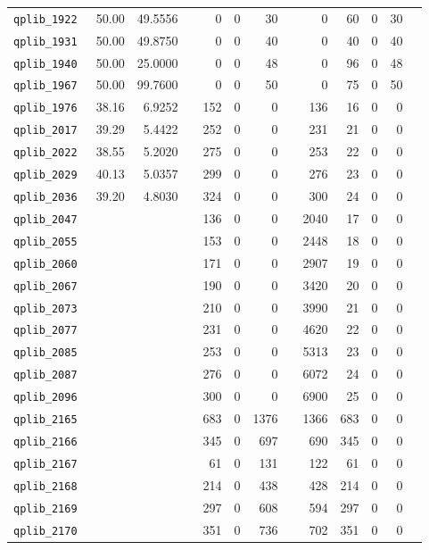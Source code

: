\begin{longtable}{lrrrrrrrrrrrr}
{\tt 	qplib\_1922	}	&	50.00	&	49.5556	&	&	0	&	0	&	30	&	&	0	&	60	&	0	&	30	\\
{\tt 	qplib\_1931	}	&	50.00	&	49.8750	&	&	0	&	0	&	40	&	&	0	&	40	&	0	&	40	\\
{\tt 	qplib\_1940	}	&	50.00	&	25.0000	&	&	0	&	0	&	48	&	&	0	&	96	&	0	&	48	\\
{\tt 	qplib\_1967	}	&	50.00	&	99.7600	&	&	0	&	0	&	50	&	&	0	&	75	&	0	&	50	\\
{\tt 	qplib\_1976	}	&	38.16	&	6.9252	&	&	152	&	0	&	0	&	&	136	&	16	&	0	&	0	\\
{\tt 	qplib\_2017	}	&	39.29	&	5.4422	&	&	252	&	0	&	0	&	&	231	&	21	&	0	&	0	\\
{\tt 	qplib\_2022	}	&	38.55	&	5.2020	&	&	275	&	0	&	0	&	&	253	&	22	&	0	&	0	\\
{\tt 	qplib\_2029	}	&	40.13	&	5.0357	&	&	299	&	0	&	0	&	&	276	&	23	&	0	&	0	\\
{\tt 	qplib\_2036	}	&	39.20	&	4.8030	&	&	324	&	0	&	0	&	&	300	&	24	&	0	&	0	\\
{\tt 	qplib\_2047	}	&		&		&	&	136	&	0	&	0	&	&	2040	&	17	&	0	&	0	\\
{\tt 	qplib\_2055	}	&		&		&	&	153	&	0	&	0	&	&	2448	&	18	&	0	&	0	\\
{\tt 	qplib\_2060	}	&		&		&	&	171	&	0	&	0	&	&	2907	&	19	&	0	&	0	\\
{\tt 	qplib\_2067	}	&		&		&	&	190	&	0	&	0	&	&	3420	&	20	&	0	&	0	\\
{\tt 	qplib\_2073	}	&		&		&	&	210	&	0	&	0	&	&	3990	&	21	&	0	&	0	\\
{\tt 	qplib\_2077	}	&		&		&	&	231	&	0	&	0	&	&	4620	&	22	&	0	&	0	\\
{\tt 	qplib\_2085	}	&		&		&	&	253	&	0	&	0	&	&	5313	&	23	&	0	&	0	\\
{\tt 	qplib\_2087	}	&		&		&	&	276	&	0	&	0	&	&	6072	&	24	&	0	&	0	\\
{\tt 	qplib\_2096	}	&		&		&	&	300	&	0	&	0	&	&	6900	&	25	&	0	&	0	\\
{\tt 	qplib\_2165	}	&		&		&	&	683	&	0	&	1376	&	&	1366	&	683	&	0	&	0	\\
{\tt 	qplib\_2166	}	&		&		&	&	345	&	0	&	697	&	&	690	&	345	&	0	&	0	\\
{\tt 	qplib\_2167	}	&		&		&	&	61	&	0	&	131	&	&	122	&	61	&	0	&	0	\\
{\tt 	qplib\_2168	}	&		&		&	&	214	&	0	&	438	&	&	428	&	214	&	0	&	0	\\
{\tt 	qplib\_2169	}	&		&		&	&	297	&	0	&	608	&	&	594	&	297	&	0	&	0	\\
{\tt 	qplib\_2170	}	&		&		&	&	351	&	0	&	736	&	&	702	&	351	&	0	&	0	\\

\end{longtable}
